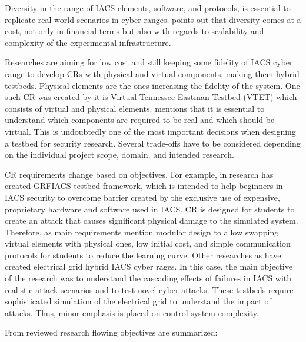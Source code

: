 Diversity in the range of IACS elements, software, and protocols, is essential to replicate real-world scenarios in cyber ranges. \citeauthor{35-ten-lessons-ics-testbeds} \parencite{35-ten-lessons-ics-testbeds} points out that diversity comes at a cost, not only in financial terms but also with regards to scalability and complexity of the experimental infrastructure.

Researches are aiming for low cost and still keeping some fidelity of IACS cyber range to develop CRs with physical and virtual components, making them hybrid testbeds. Physical elements are the ones increasing the fidelity of the system. One such CR was created by \citeauthor{06-testbed} \parencite{06-testbed} it is Virtual Tennessee-Eastman Testbed (VTET) which consists of virtual and physical elements. \citeauthor{20-dsign-and-realization-of-testbeds} \parencite{20-dsign-and-realization-of-testbeds} mentions that it is essential to understand which components are required to be real and which should be virtual. This is undoubtedly one of the most important decisions when designing a testbed for security research. Several trade-offs have to be considered depending on the individual project scope, domain, and intended research.

CR requirements change based on objectives. For example, \citeauthor{39-grfics-scada-simulator} in research \parencite{39-grfics-scada-simulator} has created GRFIACS testbed framework, which is intended to help beginners in IACS security to overcome barrier created by the exclusive use of expensive, proprietary hardware and software used in IACS. CR is designed for students to create an attack that causes significant physical damage to the simulated system. Therefore, \citeauthor{39-grfics-scada-simulator} as main requirements mention modular design to allow swapping virtual elements with physical ones, low initial cost, and simple communication protocols for students to reduce the learning curve. Other researches as \parencite{40-scada-testbed, 04-virtual-testbed} have created electrical grid hybrid IACS cyber rages. In this case, the main objective of the research was to understand the cascading effects of failures in IACS with realistic attack scenarios and to test novel cyber-attacks. These testbeds require sophisticated simulation of the electrical grid to understand the impact of attacks. Thus, minor emphasis is placed on control system complexity.


From reviewed research flowing objectives are summarized:  

